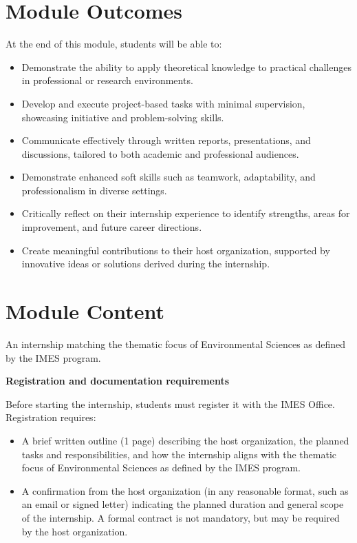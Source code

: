 \documentclass[
  letterpaper,
  10pt,
  openany]{book}
\providecommand{\tightlist}{%
  \setlength{\itemsep}{0pt}\setlength{\parskip}{0pt}}\usepackage{longtable,booktabs,array}
\begin{document}
\section*{Module Outcomes}\label{module-outcomes-5}


At the end of this module, students will be able to:

\begin{itemize}
\tightlist
\item
  Demonstrate the ability to apply theoretical knowledge to practical
  challenges in professional or research environments.
\item
  Develop and execute project-based tasks with minimal supervision,
  showcasing initiative and problem-solving skills.
\item
  Communicate effectively through written reports, presentations, and
  discussions, tailored to both academic and professional audiences.
\item
  Demonstrate enhanced soft skills such as teamwork, adaptability, and
  professionalism in diverse settings.
\item
  Critically reflect on their internship experience to identify
  strengths, areas for improvement, and future career directions.
\item
  Create meaningful contributions to their host organization, supported
  by innovative ideas or solutions derived during the internship.
\end{itemize}

\section*{Module Content}\label{module-content-6}


An internship matching the thematic focus of Environmental Sciences as
defined by the IMES program.

\textbf{Registration and documentation requirements}

Before starting the internship, students must register it with the IMES
Office. Registration requires:

\begin{itemize}
\tightlist
\item
  A brief written outline (1 page) describing the host organization, the
  planned tasks and responsibilities, and how the internship aligns with
  the thematic focus of Environmental Sciences as defined by the IMES
  program.
\item
  A confirmation from the host organization (in any reasonable format,
  such as an email or signed letter) indicating the planned duration and
  general scope of the internship. A formal contract is not mandatory,
  but may be required by the host organization.
\end{itemize}
\end{document}
